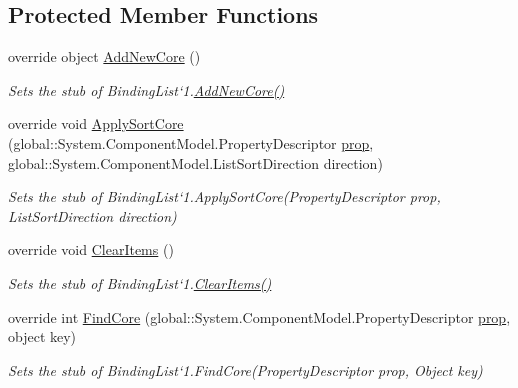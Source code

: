 \subsection*{Protected Member Functions}
\begin{DoxyCompactItemize}
\item 
override object \hyperlink{class_system_1_1_component_model_1_1_fakes_1_1_stub_binding_list_3_01_t_01_4_a6338d7a3b80c7fa1de5a3d4620a6b96b}{Add\-New\-Core} ()
\begin{DoxyCompactList}\small\item\em Sets the stub of Binding\-List`1.\hyperlink{class_system_1_1_component_model_1_1_fakes_1_1_stub_binding_list_3_01_t_01_4_a6338d7a3b80c7fa1de5a3d4620a6b96b}{Add\-New\-Core()}\end{DoxyCompactList}\item 
override void \hyperlink{class_system_1_1_component_model_1_1_fakes_1_1_stub_binding_list_3_01_t_01_4_a1b267d615d03244a3ecb69838ec5be03}{Apply\-Sort\-Core} (global\-::\-System.\-Component\-Model.\-Property\-Descriptor \hyperlink{jquery-1_810_82-vsdoc_8js_af17be84954030af6c2286f5da385d41b}{prop}, global\-::\-System.\-Component\-Model.\-List\-Sort\-Direction direction)
\begin{DoxyCompactList}\small\item\em Sets the stub of Binding\-List`1.Apply\-Sort\-Core(\-Property\-Descriptor prop, List\-Sort\-Direction direction)\end{DoxyCompactList}\item 
override void \hyperlink{class_system_1_1_component_model_1_1_fakes_1_1_stub_binding_list_3_01_t_01_4_a6f750bc8a776998c6d22dbd7398e301f}{Clear\-Items} ()
\begin{DoxyCompactList}\small\item\em Sets the stub of Binding\-List`1.\hyperlink{class_system_1_1_component_model_1_1_fakes_1_1_stub_binding_list_3_01_t_01_4_a6f750bc8a776998c6d22dbd7398e301f}{Clear\-Items()}\end{DoxyCompactList}\item 
override int \hyperlink{class_system_1_1_component_model_1_1_fakes_1_1_stub_binding_list_3_01_t_01_4_ad01525e7962a6665fb80248f829d8b72}{Find\-Core} (global\-::\-System.\-Component\-Model.\-Property\-Descriptor \hyperlink{jquery-1_810_82-vsdoc_8js_af17be84954030af6c2286f5da385d41b}{prop}, object key)
\begin{DoxyCompactList}\small\item\em Sets the stub of Binding\-List`1.Find\-Core(\-Property\-Descriptor prop, Object key)\end{DoxyCompactList}\item 

\end{DoxyCompactItemize}
